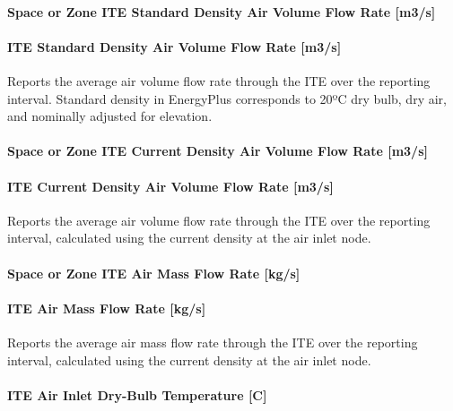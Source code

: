 \paragraph{Space or Zone ITE Standard Density Air Volume Flow Rate {[}m3/s{]}}\label{zone-ite-standard-density-air-volume-flow-rate-m3s}

\paragraph{ITE Standard Density Air Volume Flow Rate {[}m3/s{]}}\label{ite-standard-density-air-volume-flow-rate-m3s}

Reports the average air volume flow rate through the ITE over the reporting interval. Standard density in EnergyPlus corresponds to 20ºC dry bulb, dry air, and nominally adjusted for elevation.

\paragraph{Space or Zone ITE Current Density Air Volume Flow Rate {[}m3/s{]}}\label{zone-ite-current-density-air-volume-flow-rate-m3s}

\paragraph{ITE Current Density Air Volume Flow Rate {[}m3/s{]}}\label{ite-current-density-air-volume-flow-rate-m3s}

Reports the average air volume flow rate through the ITE over the reporting interval, calculated using the current density at the air inlet node.

\paragraph{Space or Zone ITE Air Mass Flow Rate {[}kg/s{]}}\label{zone-ite-air-mass-flow-rate-kgs}

\paragraph{ITE Air Mass Flow Rate {[}kg/s{]}}\label{ite-air-mass-flow-rate-kgs}

Reports the average air mass flow rate through the ITE over the reporting interval, calculated using the current density at the air inlet node.

\paragraph{ITE Air Inlet Dry-Bulb Temperature {[}C{]}}\label{ite-air-inlet-dry-bulb-temperature-c}

